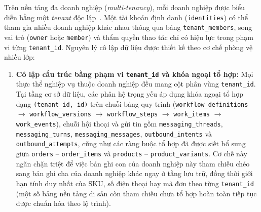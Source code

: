 Trên nền tảng đa doanh nghiệp (\emph{multi-tenancy}), mỗi doanh nghiệp được biểu diễn bằng một \emph{tenant} độc lập~\cite{chong2006multitenant,bezemer2010multitenant}. Một tài khoản định danh (\texttt{identities}) có thể tham gia nhiều doanh
nghiệp khác nhau thông qua bảng \texttt{tenant\_\hspace{0pt}members}, song vai trò (\texttt{owner} hoặc \texttt{member}) và thẩm quyền thao tác chỉ có hiệu lực trong phạm vi từng \texttt{tenant\_\hspace{0pt}id}. Nguyên
lý cô lập dữ liệu được thiết kế theo cơ chế phòng vệ nhiều lớp:
\begin{enumerate}
  \item \textbf{Cô lập cấu trúc bằng phạm vi \texttt{tenant\_\hspace{0pt}id} và khóa ngoại tổ hợp:} Mọi thực thể nghiệp vụ thuộc doanh nghiệp đều mang cột phân vùng \texttt{tenant\_\hspace{0pt}id}. Tại tầng cơ sở dữ
    liệu, các phân hệ trọng yếu áp dụng khóa ngoại tổ hợp dạng \texttt{(tenant\_\hspace{0pt}id, id)} trên chuỗi bảng quy trình (\texttt{workflow\_\hspace{0pt}definitions} $\rightarrow$
    \texttt{workflow\_\hspace{0pt}versions} $\rightarrow$ \texttt{workflow\_\hspace{0pt}steps} $\rightarrow$ \texttt{work\_\hspace{0pt}items} $\rightarrow$ \texttt{work\_\hspace{0pt}events}), chuỗi hội thoại và gửi tin gồm
    \texttt{messaging\_\hspace{0pt}threads}, \texttt{messaging\_\hspace{0pt}turns}, \texttt{messaging\_\hspace{0pt}messages}, \texttt{outbound\_\hspace{0pt}intents} và \texttt{outbound\_\hspace{0pt}attempts}, cũng
    như các ràng buộc tổ hợp đã được siết bổ sung giữa \texttt{orders} -- \texttt{order\_\hspace{0pt}items} và \texttt{products} -- \texttt{product\_\hspace{0pt}variants}. Cơ chế này ngăn chặn triệt để việc bản ghi con
    của doanh nghiệp này tham chiếu chéo sang bản ghi cha của doanh nghiệp khác ngay ở tầng lưu trữ, đồng thời giới hạn tính duy nhất của SKU, số điện thoại hay mã đơn theo từng
    \texttt{tenant\_\hspace{0pt}id} (một số bảng nền tảng di sản còn tham chiếu chưa tổ hợp hoàn toàn tiếp tục được chuẩn hóa theo lộ trình).

\end{enumerate}

